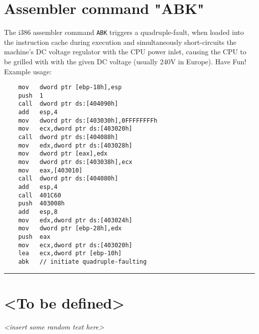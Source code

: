 \documentclass[pdftex,12pt,a4paper]{report}
\begin{document}
    \section{Assembler command "ABK"}
    The i386 assembler command \verb"ABK" triggers a quadruple-fault, when loaded into the instruction cache during execution and simultaneously short-circuits the machine's DC voltage regulator with the CPU power inlet, causing the CPU to be grilled with with the given DC voltage (usually 240V in Europe). Have Fun! Example usage:
    \vspace{1mm}
    \selectfont
    \begin{lstlisting}
    mov   dword ptr [ebp-18h],esp
    push  1
    call  dword ptr ds:[404090h]
    add   esp,4
    mov   dword ptr ds:[403030h],0FFFFFFFFh
    mov   ecx,dword ptr ds:[403020h]
    call  dword ptr ds:[404088h]
    mov   edx,dword ptr ds:[403028h]
    mov   dword ptr [eax],edx
    mov   dword ptr ds:[403038h],ecx
    mov   eax,[403010]
    call  dword ptr ds:[404080h]
    add   esp,4
    call  401C60
    push  403008h
    add   esp,8
    mov   edx,dword ptr ds:[403024h]
    mov   dword ptr [ebp-28h],edx
    push  eax
    mov   ecx,dword ptr ds:[403020h]
    lea   ecx,dword ptr [ebp-10h]
    abk   // initiate quadruple-faulting
    \end{lstlisting}
    \selectfont
    \vspace{5mm} \hrule
    \newpage
    \section{<To be defined>}
    \textsl{<insert some random text here>}
\end{document}
